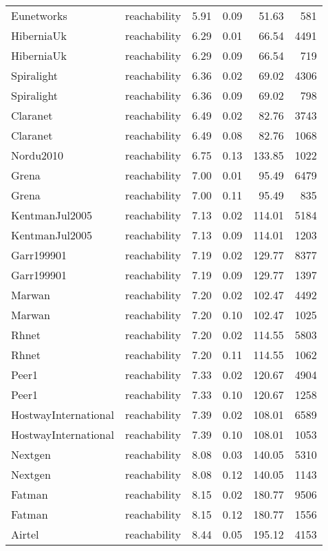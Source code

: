 \begin{tabular}{llrrrr}
Eunetworks & reachability & 5.91 & 0.09 & 51.63 & 581 \\
HiberniaUk & reachability & 6.29 & 0.01 & 66.54 & 4491 \\
HiberniaUk & reachability & 6.29 & 0.09 & 66.54 & 719 \\
Spiralight & reachability & 6.36 & 0.02 & 69.02 & 4306 \\
Spiralight & reachability & 6.36 & 0.09 & 69.02 & 798 \\
Claranet & reachability & 6.49 & 0.02 & 82.76 & 3743 \\
Claranet & reachability & 6.49 & 0.08 & 82.76 & 1068 \\
Nordu2010 & reachability & 6.75 & 0.13 & 133.85 & 1022 \\
Grena & reachability & 7.00 & 0.01 & 95.49 & 6479 \\
Grena & reachability & 7.00 & 0.11 & 95.49 & 835 \\
KentmanJul2005 & reachability & 7.13 & 0.02 & 114.01 & 5184 \\
KentmanJul2005 & reachability & 7.13 & 0.09 & 114.01 & 1203 \\
Garr199901 & reachability & 7.19 & 0.02 & 129.77 & 8377 \\
Garr199901 & reachability & 7.19 & 0.09 & 129.77 & 1397 \\
Marwan & reachability & 7.20 & 0.02 & 102.47 & 4492 \\
Marwan & reachability & 7.20 & 0.10 & 102.47 & 1025 \\
Rhnet & reachability & 7.20 & 0.02 & 114.55 & 5803 \\
Rhnet & reachability & 7.20 & 0.11 & 114.55 & 1062 \\
Peer1 & reachability & 7.33 & 0.02 & 120.67 & 4904 \\
Peer1 & reachability & 7.33 & 0.10 & 120.67 & 1258 \\
HostwayInternational & reachability & 7.39 & 0.02 & 108.01 & 6589 \\
HostwayInternational & reachability & 7.39 & 0.10 & 108.01 & 1053 \\
Nextgen & reachability & 8.08 & 0.03 & 140.05 & 5310 \\
Nextgen & reachability & 8.08 & 0.12 & 140.05 & 1143 \\
Fatman & reachability & 8.15 & 0.02 & 180.77 & 9506 \\
Fatman & reachability & 8.15 & 0.12 & 180.77 & 1556 \\
Airtel & reachability & 8.44 & 0.05 & 195.12 & 4153 \\

\end{tabular}
